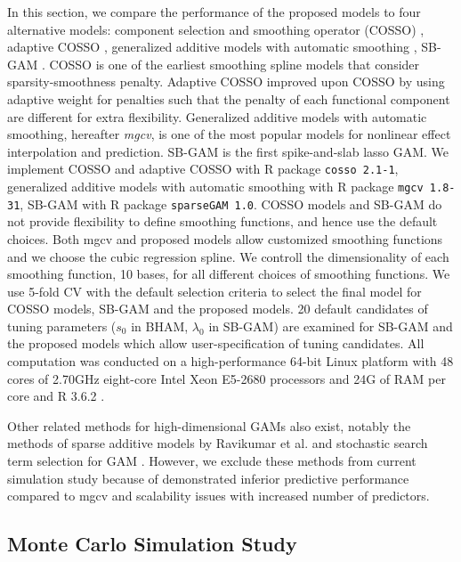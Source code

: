 \documentclass[AMA,STIX1COL,]{WileyNJD-v2}
\begin{document}
In this section, we compare the performance of the proposed models to
four alternative models: component selection and smoothing operator
(COSSO) \citep{Zhang2006GAM}, adaptive COSSO \citep{Storlie2011},
generalized additive models with automatic smoothing \citep{Wood2011},
SB-GAM \citep{Bai2021}. COSSO is one of the earliest smoothing spline
models that consider sparsity-smoothness penalty. Adaptive COSSO
improved upon COSSO by using adaptive weight for penalties such that the
penalty of each functional component are different for extra
flexibility. Generalized additive models with automatic smoothing,
hereafter \textit{mgcv}, is one of the most popular models for nonlinear
effect interpolation and prediction. SB-GAM is the first spike-and-slab
lasso GAM. We implement COSSO and adaptive COSSO with R package
\texttt{cosso 2.1-1}, generalized additive models with automatic
smoothing with R package \texttt{mgcv 1.8-31}, SB-GAM with R package
\texttt{sparseGAM 1.0}. COSSO models and SB-GAM do not provide
flexibility to define smoothing functions, and hence use the default
choices. Both mgcv and proposed models allow customized smoothing
functions and we choose the cubic regression spline. We controll the
dimensionality of each smoothing function, 10 bases, for all different
choices of smoothing functions. We use 5-fold CV with the default
selection criteria to select the final model for COSSO models, SB-GAM
and the proposed models. 20 default candidates of tuning parameters
(\(s_0\) in BHAM, \(\lambda_0\) in SB-GAM) are examined for SB-GAM and
the proposed models which allow user-specification of tuning candidates.
All computation was conducted on a high-performance 64-bit Linux
platform with 48 cores of 2.70GHz eight-core Intel Xeon E5-2680
processors and 24G of RAM per core and R 3.6.2 \citep{R}.

Other related methods for high-dimensional GAMs also exist, notably the
methods of sparse additive models by Ravikumar et al.
\citep{Ravikumar2009} and stochastic search term selection for GAM
\citep{Scheipl2012}. However, we exclude these methods from current
simulation study because of demonstrated inferior predictive performance
compared to mgcv and scalability issues with increased number of
predictors. \citep{Scheipl2013}

\hypertarget{monte-carlo-simulation-study}{%
\subsection{Monte Carlo Simulation
Study}\label{monte-carlo-simulation-study}}
\end{document}

